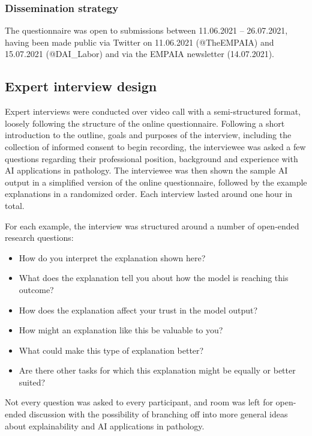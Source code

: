 \documentclass[final,5p,times,twocolumn,hyphens]{elsarticle} %
\providecommand{\DIFaddtex}[1]{{\protect\color{blue}\uwave{#1}}} %
\providecommand{\DIFaddbegin}{} %
\providecommand{\DIFaddend}{} %
\providecommand{\DIFadd}[1]{\texorpdfstring{\DIFaddtex{#1}}{#1}} %
\newcommand{\DIFaddincludegraphics}[2][]{{\color{blue}\fbox{\DIFOincludegraphics[#1]{#2}}}} %
\DeclareRobustCommand{\DIFaddbegin}{\DIFOaddbegin \let\includegraphics\DIFaddincludegraphics} %
\DeclareRobustCommand{\DIFaddend}{\DIFOaddend \let\includegraphics\DIFOincludegraphics} %
\begin{document}
\subsubsection{Dissemination strategy}

The questionnaire was open to submissions between 11.06.2021 -- 26.07.2021, having been made public via Twitter on 11.06.2021 (@TheEMPAIA) and \DIFaddbegin \DIFadd{again on }\DIFaddend 15.07.2021 (@DAI\_Labor) and via the EMPAIA newsletter (14.07.2021).

\subsection{Expert interview design}
\label{sec:interviewdesign}
Expert interviews were conducted over video call with a semi-structured format, loosely following the structure of the online questionnaire. Following a short introduction to the outline, goals and purposes of the interview, including the collection of informed consent to begin recording, the interviewee was asked a few questions regarding their professional position, background and experience with AI applications in pathology. The interviewee was then shown the sample AI output in a simplified version of the online questionnaire, followed by the example explanations in a randomized order. Each interview lasted around one hour in total.

For each example, the interview was structured around a number of open-ended research questions: 

\begin{itemize}
    \item How do you interpret the explanation shown here?
    \item What does the explanation tell you about how the model is reaching this outcome?
    \item How does the explanation affect your trust in the model output?
    \item How might an explanation like this be valuable to you?
    \item What could make this type of explanation better?
    \item Are there other tasks for which this explanation might be equally or better suited?
\end{itemize}

Not every question was asked to every participant, and room was left for open-ended discussion with the possibility of branching off into more general ideas about explainability and AI applications in pathology.
\end{document}

